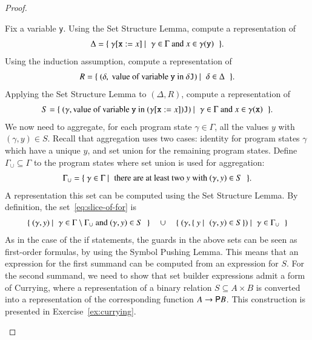 \begin{proof}
\begin{itemize}
 Fix a variable {\tt y}. Using the Set Structure Lemma, compute a representation of
	\begin{align*}
		\Delta = \setbuild{\gamma[\mathtt x := x]}{ $\gamma \in \Gamma$ and $x \in \gamma(\mathtt y)$}.
 \end{align*}
Using the induction assumption, compute a representation of
 \begin{align*}
R  = \setbuild{(\delta, \text{ value of variable {\tt y} in } \delta{\mathtt J})}{ $\delta \in \Delta$}.
 \end{align*}
Applying the  Set Structure Lemma to $(\Delta, R)$,  compute a representation of 
 \begin{align*}
S = \setbuild {(\gamma, \text{value of variable {\tt y} in }(\gamma[\mathtt x :=x]) \mathtt J)}{ $\gamma \in \Gamma$ and  $x \in \gamma(\mathtt x)$}.
 \end{align*}
We now need to aggregate, for each program state $\gamma \in \Gamma$, all  the values $y$ with $(\gamma,y) \in S$. Recall that aggregation uses two cases: identity for program states $\gamma$ which have a unique $y$, and set union for the remaining program states.
 Define $\Gamma_\cup \subseteq \Gamma$ to the program states where set union is used for aggregation:
\begin{align*} 
 \Gamma_\cup = \setbuild{\gamma \in \Gamma}{there are at least two $y$ with $(\gamma,y) \in S$}.
\end{align*}
A representation this  set can be computed using the Set Structure Lemma. By definition, the set~\eqref{eq:slice-of-for} is
 \begin{align*}
 \setbuild{(\gamma,y)}{$\gamma \in \Gamma \setminus \Gamma_\cup$ and $(\gamma,y) \in S$} \quad \cup \quad \setbuild{(\gamma, \setbuild{y}{$(\gamma,y) \in S$\!\!\!})}{$\gamma \in \Gamma_\cup$}
 \end{align*}
 As in the case of the if statements, the guards in the above sets can be seen as first-order formulas, by using the Symbol Pushing Lemma. This means that an expression for the first summand can be computed from an expression for $S$. For the second summand, we need to show that set builder expressions admit a form of Currying, where a representation of a binary relation $S \subseteq A \times B$ is converted into a representation of the  corresponding function $A \to {\mathsf P} B$. This construction is presented in Exercise~\ref{ex:currying}.
\end{itemize}	
\end{proof}





